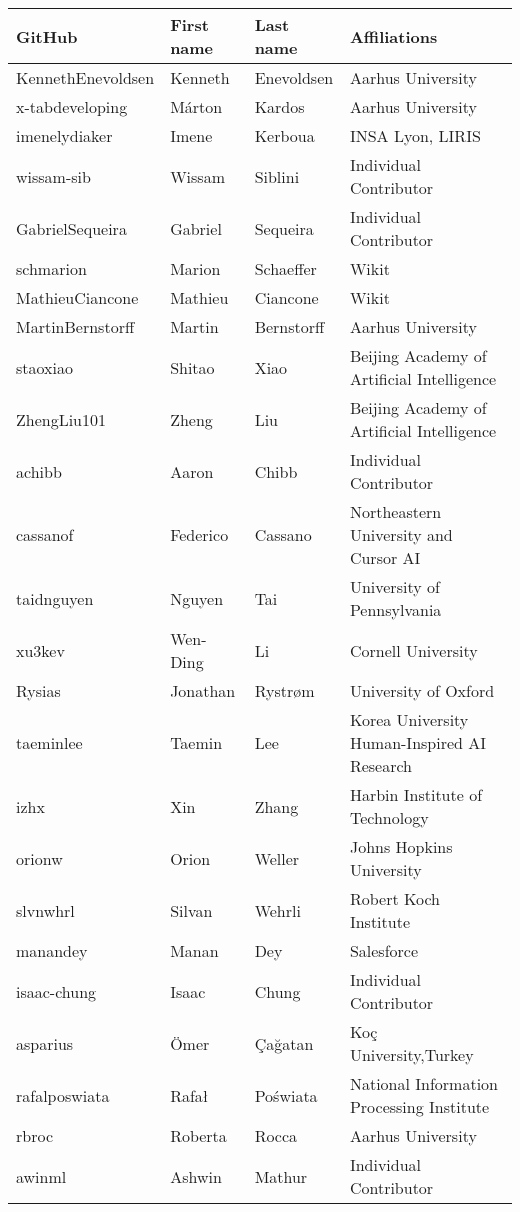 \begin{table*}
\centering
{\tiny
\begin{tabular}{llll}
\toprule
GitHub & First name & Last name & Affiliations \\
\midrule
KennethEnevoldsen & Kenneth & Enevoldsen & Aarhus University \\
x-tabdeveloping & Márton & Kardos & Aarhus University \\
imenelydiaker & Imene & Kerboua & INSA Lyon, LIRIS \\
wissam-sib & Wissam & Siblini & Individual Contributor \\
GabrielSequeira & Gabriel & Sequeira & Individual Contributor \\
schmarion & Marion & Schaeffer & Wikit \\
MathieuCiancone & Mathieu & Ciancone & Wikit \\
MartinBernstorff & Martin & Bernstorff & Aarhus University \\
staoxiao & Shitao & Xiao & Beijing Academy of Artificial Intelligence \\
ZhengLiu101 & Zheng & Liu & Beijing Academy of Artificial Intelligence \\
achibb & Aaron & Chibb & Individual Contributor \\
cassanof & Federico & Cassano & Northeastern University and Cursor AI \\
taidnguyen & Nguyen & Tai & University of Pennsylvania \\
xu3kev & Wen-Ding & Li & Cornell University \\
Rysias & Jonathan & Rystrøm & University of Oxford \\
taeminlee & Taemin & Lee & Korea University Human-Inspired AI Research \\
izhx & Xin & Zhang & Harbin Institute of Technology \\
orionw & Orion & Weller & Johns Hopkins University \\
slvnwhrl & Silvan & Wehrli & Robert Koch Institute \\
manandey & Manan & Dey & Salesforce \\
isaac-chung & Isaac & Chung & Individual Contributor \\
asparius & Ömer & Çağatan & Koç University,Turkey \\
rafalposwiata & Rafał & Poświata & National Information Processing Institute \\
rbroc & Roberta & Rocca & Aarhus University \\
awinml & Ashwin & Mathur & Individual Contributor \\

\end{tabular}}
\end{table*}

